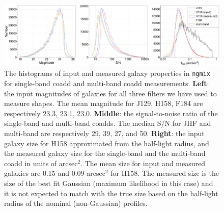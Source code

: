 \documentclass[fleqn,usenatbib]{mnras}
\begin{document}
\begin{figure}
    \centering
	\includegraphics[width=\textwidth]{true_ngmix_measured_properties_pplt.pdf}
    \caption{The histograms of input and measured galaxy properties in \texttt{ngmix} for single-band coadd and multi-band coadd measurements. \textbf{Left}: the input magnitudes of galaxies for all three filters we have used to measure shapes. The mean magnitude for J129, H158, F184 are respectively 23.3, 23.1, 23.0. \textbf{Middle}: the signal-to-noise ratio of the single-band and multi-band coadds. The median S/N for JHF and multi-band are respectively 29, 39, 27, and 50. \textbf{Right}: the input galaxy size for H158 approximated from the half-light radius, and the measured galaxy size for the single-band and the multi-band coadd in units of arcsec$^2$. The mean size for input and measured galaxies are 0.15 and 0.09 arcsec$^2$ for H158. The measured size is the size of the best fit Gaussian (maximum likelihood in this case) and it is not expected to match with the true size based on the half-light radius of the nominal (non-Gaussian) profiles.}
    \label{fig:ngmix_measured_properties}
\end{figure}

\end{document}
